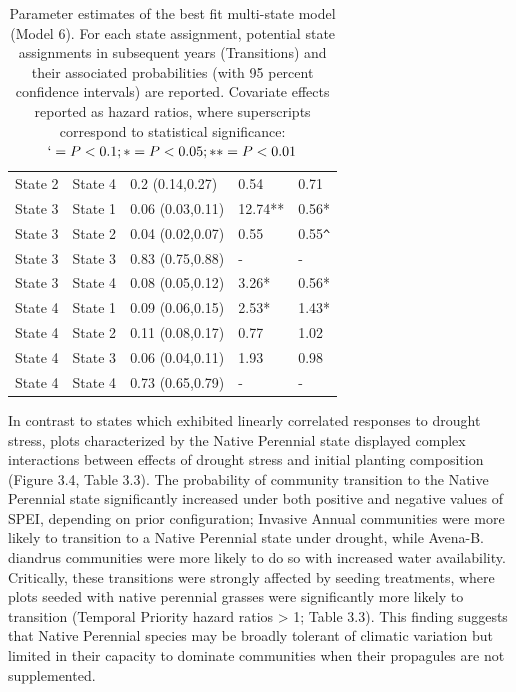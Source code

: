 \documentclass[twoside,12pt,final]{ucthesis-CA2012}
\begin{document}
\begin{ucmainmatter}
\begin{table}[ht]
\begin{tabular}{lllll}
  State 2 & State 4 & 0.2 (0.14,0.27) & 0.54 & 0.71 \\ 
  State 3 & State 1 & 0.06 (0.03,0.11) & 12.74** & 0.56* \\ 
  State 3 & State 2 & 0.04 (0.02,0.07) & 0.55 & 0.55\verb|^| \\ 
  State 3 & State 3 & 0.83 (0.75,0.88) & - & - \\ 
  State 3 & State 4 & 0.08 (0.05,0.12) & 3.26* & 0.56* \\ 
  State 4 & State 1 & 0.09 (0.06,0.15) & 2.53* & 1.43* \\ 
  State 4 & State 2 & 0.11 (0.08,0.17) & 0.77 & 1.02 \\ 
  State 4 & State 3 & 0.06 (0.04,0.11) & 1.93 & 0.98 \\ 
  State 4 & State 4 & 0.73 (0.65,0.79) & - & - \\ 
   \hline
\end{tabular}
\caption{Parameter estimates of the best fit multi-state model (Model 6). For each state assignment, potential state assignments in subsequent years (Transitions) and their associated probabilities (with 95 percent confidence intervals) are reported. Covariate effects reported as hazard ratios, where superscripts correspond to statistical significance: $` = P < 0.1; * = P < 0.05; ** = P < 0.01$} 
\end{table}
In contrast to states which exhibited linearly correlated responses to drought stress, plots characterized by the Native Perennial state displayed complex interactions between effects of drought stress and initial planting composition (Figure 3.4, Table 3.3).
The probability of community transition to the Native Perennial state significantly increased under both positive and negative values of SPEI, depending on prior configuration; Invasive Annual communities were more likely to transition to a Native Perennial state under drought, while Avena-B. diandrus communities were more likely to do so with increased water availability.
Critically, these transitions were strongly affected by seeding treatments, where plots seeded with native perennial grasses were significantly more likely to transition (Temporal Priority hazard ratios \textgreater{} 1; Table 3.3).
This finding suggests that Native Perennial species may be broadly tolerant of climatic variation but limited in their capacity to dominate communities when their propagules are not supplemented.
\begin{figure}
\centering

\end{figure}
\end{ucmainmatter}
\end{document}
